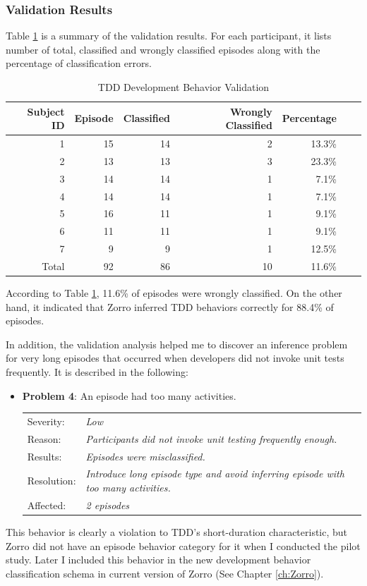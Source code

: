 \subsubsection{Validation Results}
Table \ref{tab:EsrPilotStudy} is a summary of the validation results. For each
participant, it lists number of total, classified and wrongly classified
episodes along with the percentage of classification errors. 
\begin{table}[htbp]
\centering
  \caption{TDD Development Behavior Validation}
  \begin{tabular}{|r|r|r|r|r|r|r|}
  \hline
    Subject ID & Episode & Classified & Wrongly Classified & Percentage \\ \hline
    1          & 15 &  14 &  2 & 13.3\% \\ \hline
    2          & 13 &  13 &  3 & 23.3\% \\ \hline
    3          & 14 &  14 &  1 &  7.1\% \\ \hline
    4          & 14 &  14 &  1 &  7.1\% \\ \hline
    5          & 16 &  11 &  1 &  9.1\% \\ \hline
    6          & 11 &  11 &  1 &  9.1\% \\ \hline
    7          &  9 &   9 &  1 & 12.5\% \\ \hline \hline
    Total      & 92 &  86 & 10 & 11.6\% \\ 
  \hline
  \end{tabular}
  \label{tab:EsrPilotStudy}  
\end{table}
According to Table \ref{tab:EsrPilotStudy}, 11.6\% of episodes 
were wrongly classified. On the other hand, it indicated  that Zorro 
inferred TDD behaviors correctly for 88.4\% of episodes.

In addition, the validation analysis helped me to discover an inference 
problem for very long episodes that occurred when developers did not 
invoke unit tests frequently. It is described in the following:
\begin{itemize}
\item {\textbf{Problem 4}: An episode had too many activities.
  \begin{tabular}{lp{10cm}}
    Severity: & \small\textit{Low}\\
    Reason: & \small\textit{Participants did not invoke unit testing 
              frequently enough.}\\
    Results: & \small\textit{Episodes were misclassified.}\\
    Resolution: & \small\textit{Introduce long episode type and 
                  avoid inferring episode with too many activities.} \\ 
    Affected: & \small\textit{2 episodes}
  \end{tabular}}
\end{itemize}
This behavior is clearly a violation to TDD's short-duration 
characteristic, but Zorro did not have an episode behavior category 
for it when I conducted the pilot study. Later I included this behavior 
in the new development behavior classification schema in current 
version of Zorro (See Chapter \ref{ch:Zorro}).

